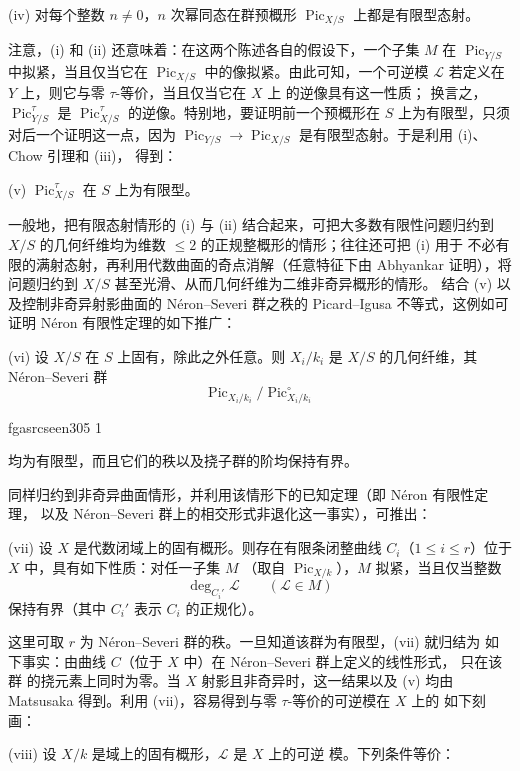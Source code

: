 \documentclass[12pt,twoside,openany]{book}
\numberwithin{equation}{section}
\newcommand{\fgaunitid}{unbound}
\newcommand{\src}[1]{%
  \phantomsection
  \hypertarget{src:\fgaunitid:#1}{}%
  \hypertarget{fga.\fgaunitid.p#1}{}%
  \ifcsname fgasrcseen#1\endcsname\else
    \expandafter\gdef\csname fgasrcseen#1\endcsname{1}%
    \hypertarget{src:#1}{}%
  \fi
  \marginpar{\raggedleft\footnotesize\sffamily #1}%
}
\theoremstyle{plain}
\theoremstyle{definition}
\theoremstyle{remark}
\begin{document}
\noindent(iv) 对每个整数 $n\neq0$，$n$ 次幂同态在群预概形
$\operatorname{Pic}_{X/S}$ 上都是有限型态射。

注意，(i) 和 (ii) 还意味着：在这两个陈述各自的假设下，一个子集 $M$ 在
$\operatorname{Pic}_{Y/S}$ 中拟紧，当且仅当它在
$\operatorname{Pic}_{X/S}$ 中的像拟紧。由此可知，一个可逆模
$\mathcal L$ 若定义在 $Y$ 上，则它与零 $\tau$-等价，当且仅当它在 $X$ 上
的逆像具有这一性质；
换言之，$\operatorname{Pic}_{Y/S}^\tau$ 是
$\operatorname{Pic}_{X/S}^\tau$ 的逆像。特别地，要证明前一个预概形在
$S$ 上为有限型，只须对后一个证明这一点，因为
$\operatorname{Pic}_{Y/S}\longrightarrow
\operatorname{Pic}_{X/S}$ 是有限型态射。于是利用 (i)、Chow 引理和 (iii)，
得到：

\medskip
\noindent(v) $\operatorname{Pic}_{X/S}^\tau$ 在 $S$ 上为有限型。

一般地，把有限态射情形的 (i) 与 (ii) 结合起来，可把大多数有限性问题归约到
$X/S$ 的几何纤维均为维数 $\leq2$ 的正规整概形的情形；往往还可把 (i) 用于
不必有限的满射态射，再利用代数曲面的奇点消解（任意特征下由 Abhyankar
证明），将问题归约到 $X/S$ 甚至光滑、从而几何纤维为二维非奇异概形的情形。
结合 (v) 以及控制非奇异射影曲面的 Néron--Severi 群之秩的 Picard--Igusa
不等式，这例如可证明 Néron 有限性定理的如下推广：

\medskip
\noindent(vi) 设 $X/S$ 在 $S$ 上固有，除此之外任意。则 $X_i/k_i$ 是
$X/S$ 的几何纤维，其 Néron--Severi 群
\[
\operatorname{Pic}_{X_i/k_i}/\operatorname{Pic}_{X_i/k_i}^\circ
\]

\src{305}
均为有限型，而且它们的秩以及挠子群的阶均保持有界。

同样归约到非奇异曲面情形，并利用该情形下的已知定理（即 Néron 有限性定理，
以及 Néron--Severi 群上的相交形式非退化这一事实），可推出：

\medskip
\noindent(vii) 设 $X$ 是代数闭域上的固有概形。则存在有限条闭整曲线
$C_i$（$1\leq i\leq r$）位于 $X$ 中，具有如下性质：对任一子集 $M$
（取自 $\operatorname{Pic}_{X/k}$），$M$ 拟紧，当且仅当整数
\[
\deg_{C_i'}\mathcal L\qquad(\mathcal L\in M)
\]
保持有界（其中 $C_i'$ 表示 $C_i$ 的正规化）。

这里可取 $r$ 为 Néron--Severi 群的秩。一旦知道该群为有限型，(vii) 就归结为
如下事实：由曲线 $C$（位于 $X$ 中）在 Néron--Severi 群上定义的线性形式，
只在该群
的挠元素上同时为零。当 $X$ 射影且非奇异时，这一结果以及 (v) 均由
Matsusaka 得到。利用 (vii)，容易得到与零 $\tau$-等价的可逆模在 $X$ 上的
如下刻画：

\medskip
\noindent(viii) 设 $X/k$ 是域上的固有概形，$\mathcal L$ 是 $X$ 上的可逆
模。下列条件等价：
\end{document}
